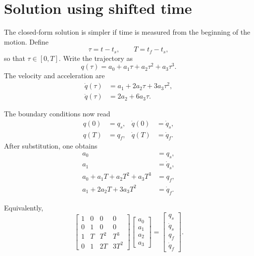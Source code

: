\documentclass[11pt,a4paper]{article}
\begin{document}
\section{Solution using shifted time}

The closed-form solution is simpler if time is measured from the beginning
of the motion. Define
\begin{equation}
    \tau=t-t_s,
    \qquad
    T=t_f-t_s,
\end{equation}
so that $\tau\in[0,T]$. Write the trajectory as
\begin{equation}
    q(\tau)=a_0+a_1\tau+a_2\tau^2+a_3\tau^3.
\end{equation}
The velocity and acceleration are
\begin{align}
    \dot q(\tau) &= a_1+2a_2\tau+3a_3\tau^2,\\
    \ddot q(\tau) &= 2a_2+6a_3\tau.
\end{align}

The boundary conditions now read
\begin{align}
    q(0) &= q_s, & \dot q(0) &= \dot q_s,\\
    q(T) &= q_f, & \dot q(T) &= \dot q_f.
\end{align}
After substitution, one obtains
\begin{align}
    a_0 &= q_s,\\
    a_1 &= \dot q_s,\\
    a_0+a_1T+a_2T^2+a_3T^3 &= q_f,\\
    a_1+2a_2T+3a_3T^2 &= \dot q_f.
\end{align}

Equivalently,
\begin{equation}
\begin{bmatrix}
    1 & 0 & 0   & 0\\
    0 & 1 & 0   & 0\\
    1 & T & T^2 & T^3\\
    0 & 1 & 2T  & 3T^2
\end{bmatrix}
\begin{bmatrix}
    a_0\\a_1\\a_2\\a_3
\end{bmatrix}
=
\begin{bmatrix}
    q_s\\\dot q_s\\q_f\\\dot q_f
\end{bmatrix}.
\end{equation}
\end{document}

